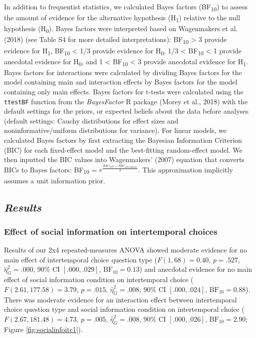 \documentclass[
  pub,floatsintext]{apa6}
\begin{document}
In addition to frequentist statistics, we calculated Bayes factors (BF\textsubscript{10}) to assess the amount of evidence for the alternative hypothesis (H\textsubscript{1}) relative to the null hypothesis (H\textsubscript{0}). Bayes factors were interpreted based on Wagenmakers et al. (2018) (see Table S4 for more detailed interpretations): BF\textsubscript{10} \textgreater{} 3 provide evidence for H\textsubscript{1}, BF\textsubscript{10} \textless{} 1/3 provide evidence for H\textsubscript{0}, 1/3 \textless{} BF\textsubscript{10} \textless{} 1 provide anecdotal evidence for H\textsubscript{0}, and 1 \textless{} BF\textsubscript{10} \textless{} 3 provide anecdotal evidence for H\textsubscript{1}. Bayes factors for interactions were calculated by dividing Bayes factors for the model containing main and interaction effects by Bayes factors for the model containing only main effects. Bayes factors for t-tests were calculated using the \texttt{ttestBF} function from the \emph{BayesFactor} R package (Morey et al., 2018) with the default settings for the priors, or expected beliefs about the data before analyses (default settings: Cauchy distributions for effect sizes and noninformative/uniform distributions for variance). For linear models, we calculated Bayes factors by first extracting the Bayesian Information Criterion (BIC) for each fixed-effect model and the best-fitting random-effect model. We then inputted the BIC values into Wagenmakers' (2007) equation that converts BICs to Bayes factors: BF\textsubscript{10} = \(e^{\frac{BIC_{null} - BIC_{alternative}}{2}}\). This approximation implicitly assumes a unit information prior.

\hypertarget{results}{%
\subsection{\texorpdfstring{\emph{Results}}{Results}}\label{results}}

\hypertarget{effect-of-social-information-on-intertemporal-choices}{%
\subsubsection{Effect of social information on intertemporal choices}\label{effect-of-social-information-on-intertemporal-choices}}

Results of our 2x4 repeated-measures ANOVA showed moderate evidence for no main effect of intertemporal choice question type (\(F(1, 68) = 0.40\), \(p = .527\), \(\hat{\eta}^2_G = .000\), 90\% CI \([.000, .029]\), \(\mathrm{BF}_{\textrm{10}} = 0.13\)) and anecdotal evidence for no main effect of social information condition on intertemporal choice (\(F(2.61, 177.58) = 3.79\), \(p = .015\), \(\hat{\eta}^2_G = .008\), 90\% CI \([.000, .024]\), \(\mathrm{BF}_{\textrm{10}} = 0.88\)). There was moderate evidence for an interaction effect between intertemporal choice question type and social information condition on intertemporal choice (\(F(2.67, 181.48) = 4.73\), \(p = .005\), \(\hat{\eta}^2_G = .008\), 90\% CI \([.000, .026]\), \(\mathrm{BF}_{\textrm{10}} = 2.90\); Figure \ref{fig:socialinfoitc1}).
\end{document}
